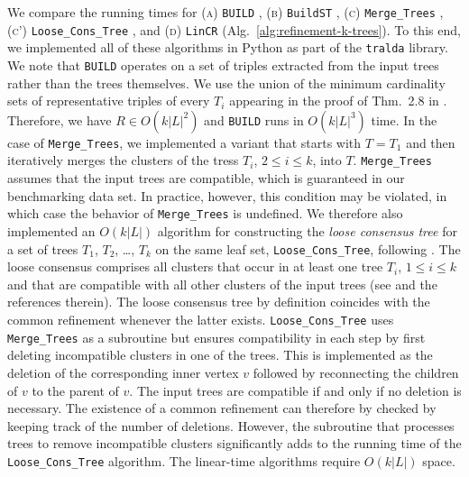 \documentclass[11pt]{article}
\begin{document}
We compare the running times for (\textsc{a}) \texttt{BUILD} \cite{Aho:81},
(\textsc{b}) \texttt{BuildST} \cite{Deng:18}, (\textsc{c})
\texttt{Merge_Trees} \cite{Jansson:16}, (\textsc{c'})
\texttt{Loose_Cons_Tree} \cite{Jansson:16}, and (\textsc{d}) \texttt{LinCR}
(Alg.~\ref{alg:refinement-k-trees}).  To this end, we implemented all of
these algorithms in Python as part of the \texttt{tralda} library.  We note
that \texttt{BUILD} operates on a set of triples extracted from the input
trees rather than the trees themselves.  We use the union of the minimum
cardinality sets of representative triples of every $T_i$ appearing in the
proof of Thm.~2.8 in \cite{Gruenewald:07a}.  Therefore, we have
$R\in O(k|L|^2)$ \cite[Thm.~6.4]{Seemann:18} and \texttt{BUILD} runs in
$O(k|L|^3)$ time.  In the case of \texttt{Merge_Trees}, we implemented a
variant that starts with $T=T_1$ and then iteratively merges the clusters
of the tress $T_i$, $2\le i\le k$, into $T$.  \texttt{Merge_Trees} assumes
that the input trees are compatible, which is guaranteed in our
benchmarking data set.  In practice, however, this condition may be
violated, in which case the behavior of \texttt{Merge_Trees} is undefined.
We therefore also implemented an $O(k|L|)$ algorithm for constructing the
\emph{loose consensus tree} for a set of trees $T_1$, $T_2$, \dots, $T_k$
on the same leaf set, \texttt{Loose_Cons_Tree}, following
\cite{Jansson:16}.  The loose consensus comprises all clusters that occur
in at least one tree $T_i$, $1\le i\le k$ and that are compatible with all
other clusters of the input trees (see \cite{Bremer:90, Day:03,Dong:11} and
the references therein).  The loose consensus tree by definition coincides
with the common refinement whenever the latter exists.
\texttt{Loose_Cons_Tree} uses \texttt{Merge_Trees} as a subroutine but
ensures compatibility in each step by first deleting incompatible clusters
in one of the trees. This is implemented as the deletion of the
corresponding inner vertex $v$ followed by reconnecting the children of $v$
to the parent of $v$. The input trees are compatible if and only if no
deletion is necessary. The existence of a common refinement can therefore
by checked by keeping track of the number of deletions.  However, the
subroutine that processes trees to remove incompatible clusters
significantly adds to the running time of the \texttt{Loose_Cons_Tree}
algorithm. The linear-time algorithms require $O(k|L|)$ space.
\end{document}
